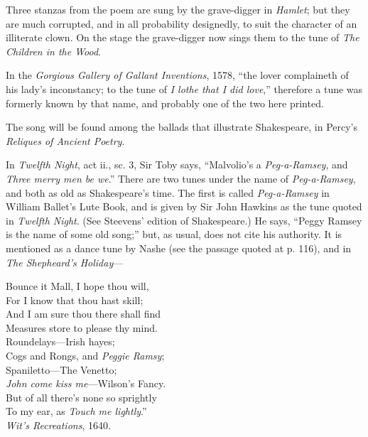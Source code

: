 Three stanzas from the poem are sung by the grave-digger in \textit{Hamlet}; but
they are much corrupted, and in all probability designedly, to suit the character
of an illiterate clown. On the stage the grave-digger now sings them to the tune
of \textit{The Children in the Wood}.

In the \textit{Gorgious Gallery of Gallant Inventions}, 1578, “the lover complaineth
of his lady’s inconstancy; to the tune of \textit{I lothe that I did love},” therefore a tune
was formerly known by that name, and probably one of the two here printed.

The song will be found among the ballads that illustrate Shakespeare, in Percy’s
\textit{Reliques of Ancient Poetry}.


\pagebreak%


In \textit{Twelfth Night}, act ii., sc. 3, Sir Toby says, “Malvolio’s a \textit{Peg-a-Ramsey},
and \textit{Three merry men be we}.” There are two tunes under the name of \textit{Peg-a-Ramsey},
and both as old as Shakespeare’s time. The first is called \textit{Peg-a-Ramsey}
in William Ballet’s Lute Book, and is given by Sir John Hawkins as the tune
quoted in \textit{Twelfth Night}. (See Steevens’ edition of Shakespeare.) He says,
“Peggy Ramsey is the name of some old song;” but, as usual, does not cite his
authority. It is mentioned as a dance tune by Nashe (see the passage quoted at
p. 116), and in \textit{The Shepheard’s Holiday}—


\settowidth{\versewidth}{And I am sure thou there shall find}
\begin{dcverse}
Bounce it Mall, I hope thou will,\\
For I know that thou hast skill;\\
And I am sure thou there shall find\\
Measures store to please thy mind.\\
Roundelays—Irish hayes;\\
Cogs and Rongs, and \textit{Peggie Ramsy};\\
Spaniletto—The Venetto;\\
\textit{John come kiss me}—Wilson’s Fancy.\\
But of all there’s none so sprightly\\
To my ear, as \textit{Touch me lightly}.”\\
\vin\vin\vin \textit{Wit’s Recreations}, 1640.
\end{dcverse}

